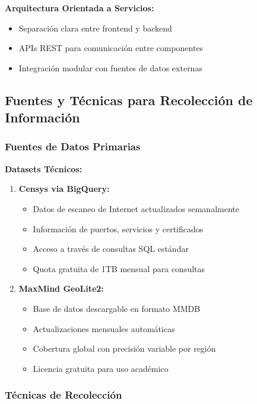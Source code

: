 \textbf{Arquitectura Orientada a Servicios:}
\begin{itemize}
    \item Separación clara entre frontend y backend
    \item APIs REST para comunicación entre componentes
    \item Integración modular con fuentes de datos externas
\end{itemize}

\subsection{Fuentes y Técnicas para Recolección de Información}

\subsubsection{Fuentes de Datos Primarias}

\textbf{Datasets Técnicos:}
\begin{enumerate}
    \item \textbf{Censys via BigQuery:}
    \begin{itemize}
        \item Datos de escaneo de Internet actualizados semanalmente
        \item Información de puertos, servicios y certificados
        \item Acceso a través de consultas SQL estándar
        \item Quota gratuita de 1TB mensual para consultas
    \end{itemize}
    
    \item \textbf{MaxMind GeoLite2:}
    \begin{itemize}
        \item Base de datos descargable en formato MMDB
        \item Actualizaciones mensuales automáticas
        \item Cobertura global con precisión variable por región
        \item Licencia gratuita para uso académico
    \end{itemize}
\end{enumerate}

\subsubsection{Técnicas de Recolección}


